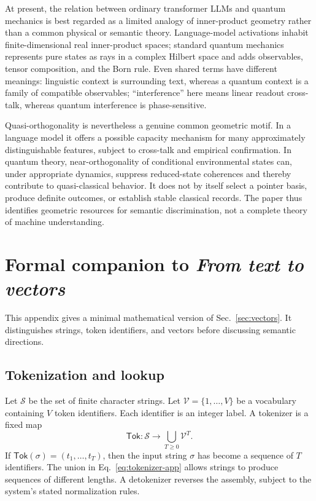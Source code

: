 \documentclass[
  aps,
  reprint,
  superscriptaddress,
  floatfix,
  nofootinbib,
  longbibliography
]{revtex4-2}
\begin{document}
At present, the relation between ordinary transformer LLMs and quantum mechanics
is best regarded as a limited analogy of inner-product geometry rather than a
common physical or semantic theory.  Language-model activations inhabit
finite-dimensional real inner-product spaces; standard quantum mechanics
represents pure states as rays in a complex Hilbert space and adds observables,
tensor composition, and the Born rule.  Even shared terms have different
meanings: linguistic context is surrounding text, whereas a quantum context is
a family of compatible observables; ``interference'' here means linear readout
cross-talk, whereas quantum interference is phase-sensitive.

Quasi-orthogonality is nevertheless a genuine common geometric motif.  In a
language model it offers a possible capacity mechanism for many approximately
distinguishable features, subject to cross-talk and empirical confirmation.
In quantum theory, near-orthogonality of conditional environmental states can,
under appropriate dynamics, suppress reduced-state coherences and thereby
contribute to quasi-classical behavior.  It does not by itself select a pointer
basis, produce definite outcomes, or establish stable classical records.  The
paper thus identifies geometric resources for semantic discrimination, not a
complete theory of machine understanding.

\appendix

\section{Formal companion to \emph{From text to vectors}}
\label{app:vectors}

This appendix gives a minimal mathematical version of
Sec.~\ref{sec:vectors}.  It distinguishes strings, token identifiers, and
vectors before discussing semantic directions.

\subsection{Tokenization and lookup}

Let $\mathcal S$ be the set of finite character strings.  Let
$\mathcal V=\{1,\ldots,V\}$ be a vocabulary containing $V$ token identifiers.
Each identifier is an integer label.  A tokenizer is a fixed map
\begin{equation}
 \mathsf{Tok}:\mathcal S\longrightarrow
 \bigcup_{T\geq0}\mathcal V^T.
 \label{eq:tokenizer-app}
\end{equation}
If $\mathsf{Tok}(\sigma)=(t_1,\ldots,t_T)$, then the input string $\sigma$
has become a sequence of $T$ identifiers.  The union in
Eq.~\eqref{eq:tokenizer-app} allows strings to produce sequences of different
lengths.  A detokenizer reverses the assembly, subject to the system's stated
normalization rules.
\end{document}
